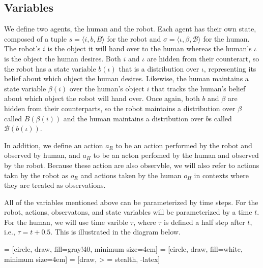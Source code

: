 \documentclass{article}
\begin{document}
\subsection{Variables}

\newcommand{\Beta}{\mathcal{B}}
We define two agents, the human and the robot. Each agent has their own state, composed of a tuple $s = \langle i, b, B \rangle$ for the robot and $\sigma = \langle \iota, \beta, \Beta \rangle$ for the human. The robot's $i$ is the object it will hand over to the human whereas the human's $\iota$ is the object the human desires. Both $i$ and $\iota$ are hidden from their counterart, so the robot has a state variable $b(\iota)$ that is a distribution over $\iota$, representing its belief about which object the human desires. Likewise, the human maintains a state variable $\beta(i)$ over the human's object $i$ that tracks the human's belief about which object the robot will hand over. Once again, both $b$ and $\beta$ are hidden from their counterparts, so the robot maintains a distribution over $\beta$ called $B(\beta(i))$ and the human maintains a distribution over $b$s called $\Beta(b(\iota))$. 

In addition, we define an action $a_R$ to be an action performed by the robot and observed by human, and $a_H$ to be an acton perfomed by the human and observed by the robot. Because these action are also observble, we will also refer to actions takn by the robot as $o_R$ and actions taken by the human $o_H$ in contexts where they are treated as observations. 

All of the variables mentioned above can be parameterized by time steps. For the robot, actions, observatons, and state variables will be parameterized by a time $t$. For the human, we will use time varible $\tau$, where $\tau$ is defined a half step after $t$, i.e., $\tau = t + 0.5$. This is illustrated in the diagram below. 


 = [circle, draw, fill=gray!40, minimum size=4em]
 = [circle, draw, fill=white, minimum size=4em]
 = [draw, > = stealth, -latex]
\end{document}

